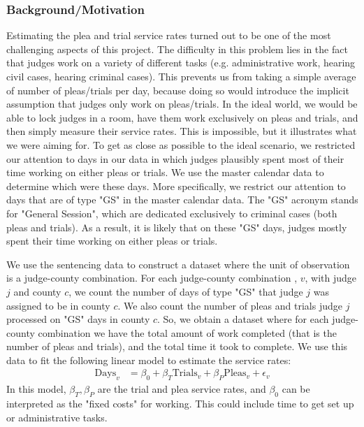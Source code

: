 \documentclass[11pt, oneside]{article}   	%
\theoremstyle{ModifiedStyle}
\begin{document}
		\subsubsection{Background/Motivation}
	    Estimating the plea and trial service rates turned out to be one of the most challenging
			aspects of this project. The difficulty in this problem lies in the fact that judges
			work on a variety of different tasks (e.g. administrative work, hearing civil cases, hearing criminal cases).
			This prevents us from taking a simple average of number of pleas/trials per day, because doing so would
			introduce the implicit assumption that judges only work on pleas/trials. In the ideal world,
			we would be able to lock judges in a room, have them work exclusively on pleas and trials, and
			then simply measure their service rates. This is impossible, but it illustrates what we were aiming for.
			To get as close as possible to the ideal scenario, we restricted our attention to days in our data in which
			judges plausibly spent most of their time working on either pleas or trials. We use the master calendar data
			to determine which were these days. More specifically, we restrict our attention to days that are of type "GS" in
			the master calendar data. The "GS" acronym stands for "General Session", which are dedicated exclusively to criminal
			cases (both pleas and trials). As a result, it is likely that on these "GS" days, judges mostly spent their time working on either pleas or trials.

			We use the sentencing data to construct a dataset where the unit of observation is a judge-county combination. For each judge-county combination , $v$, with judge $j$ and county $c$, we count the number of days of type "GS" that judge $j$ was assigned to be in county $c$. We also count the number of pleas and trials judge $j$ processed on "GS" days in county $c$. So, we obtain a dataset where for each judge-county combination we have the total amount of work completed (that is the number of pleas and trials), and the total time it took to complete. We use this data to fit the following linear model to estimate the service rates:
			\begin{align*}
				\text{Days}_v &= \beta_0 + \beta_T \text{Trials}_v + \beta_P \text{Pleas}_v + \epsilon_v
			\end{align*}
			In this model, $\beta_T,\beta_P$ are the trial and plea service rates, and $\beta_0$ can be interpreted as the "fixed costs" for working. This could include time to get set up or administrative tasks.
\end{document}
